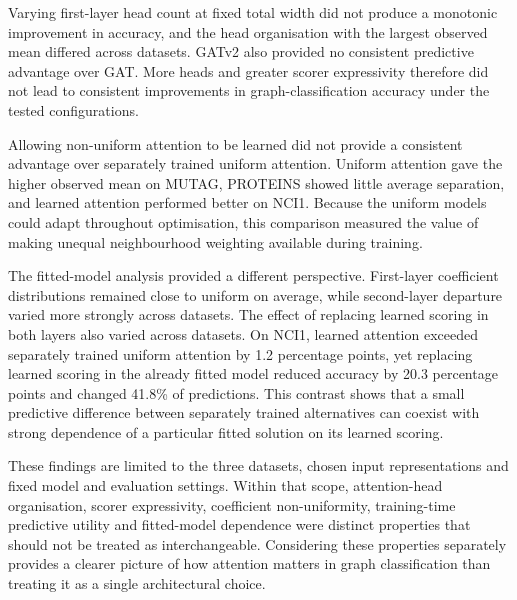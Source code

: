 \documentclass[11pt,a4paper]{article}
\begin{document}
Varying first-layer head count at fixed total width did not produce a monotonic improvement in accuracy, and the head organisation with the largest observed mean differed across datasets. GATv2 also provided no consistent predictive advantage over GAT. More heads and greater scorer expressivity therefore did not lead to consistent improvements in graph-classification accuracy under the tested configurations.

Allowing non-uniform attention to be learned did not provide a consistent advantage over separately trained uniform attention. Uniform attention gave the higher observed mean on MUTAG, PROTEINS showed little average separation, and learned attention performed better on NCI1. Because the uniform models could adapt throughout optimisation, this comparison measured the value of making unequal neighbourhood weighting available during training.

The fitted-model analysis provided a different perspective. First-layer coefficient distributions remained close to uniform on average, while second-layer departure varied more strongly across datasets. The effect of replacing learned scoring in both layers also varied across datasets. On NCI1, learned attention exceeded separately trained uniform attention by 1.2 percentage points, yet replacing learned scoring in the already fitted model reduced accuracy by 20.3 percentage points and changed 41.8\% of predictions. This contrast shows that a small predictive difference between separately trained alternatives can coexist with strong dependence of a particular fitted solution on its learned scoring.

These findings are limited to the three datasets, chosen input representations and fixed model and evaluation settings. Within that scope, attention-head organisation, scorer expressivity, coefficient non-uniformity, training-time predictive utility and fitted-model dependence were distinct properties that should not be treated as interchangeable. Considering these properties separately provides a clearer picture of how attention matters in graph classification than treating it as a single architectural choice.





\clearpage
{}
{}


\end{document}
